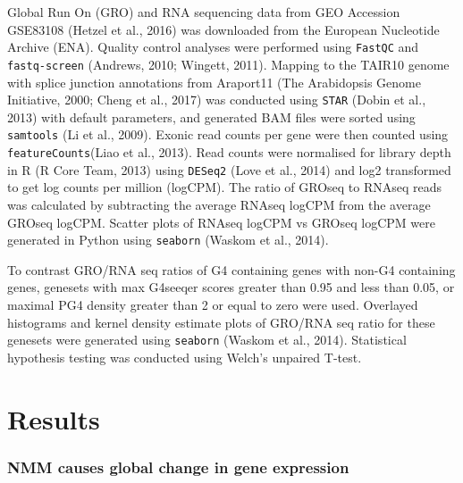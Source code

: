 \documentclass[12pt,a4paper,]{report}
\begin{document}
Global Run On (GRO) and RNA sequencing data from GEO Accession GSE83108
(Hetzel et al., 2016) was downloaded from the European Nucleotide
Archive (ENA). Quality control analyses were performed using
\texttt{FastQC} and \texttt{fastq-screen} (Andrews, 2010; Wingett,
2011). Mapping to the TAIR10 genome with splice junction annotations
from Araport11 (The Arabidopsis Genome Initiative, 2000; Cheng et al.,
2017) was conducted using \texttt{STAR} (Dobin et al., 2013) with
default parameters, and generated BAM files were sorted using
\texttt{samtools} (Li et al., 2009). Exonic read counts per gene were
then counted using \texttt{featureCounts}(Liao et al., 2013). Read
counts were normalised for library depth in R (R Core Team, 2013) using
\texttt{DESeq2} (Love et al., 2014) and log2 transformed to get log
counts per million (logCPM). The ratio of GROseq to RNAseq reads was
calculated by subtracting the average RNAseq logCPM from the average
GROseq logCPM. Scatter plots of RNAseq logCPM vs GROseq logCPM were
generated in Python using \texttt{seaborn} (Waskom et al., 2014).

To contrast GRO/RNA seq ratios of G4 containing genes with non-G4
containing genes, genesets with max G4seeqer scores greater than 0.95
and less than 0.05, or maximal PG4 density greater than 2 or equal to
zero were used. Overlayed histograms and kernel density estimate plots
of GRO/RNA seq ratio for these genesets were generated using
\texttt{seaborn} (Waskom et al., 2014). Statistical hypothesis testing
was conducted using Welch's unpaired T-test.

\newpage

\hypertarget{results-1}{%
\section{Results}\label{results-1}}

\hypertarget{nmm-causes-global-change-in-gene-expression}{%
\subsubsection{NMM causes global change in gene
expression}\label{nmm-causes-global-change-in-gene-expression}}
\end{document}
